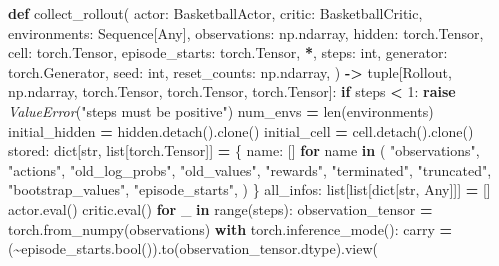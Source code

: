 \documentclass[
  american,
  11pt,
  letterpaper,
]{article}
\newenvironment{Shaded}{\begin{snugshade}}{\end{snugshade}}
\newcommand{\BuiltInTok}[1]{#1}
\newcommand{\ControlFlowTok}[1]{\textcolor[rgb]{0.13,0.29,0.53}{\textbf{#1}}}
\newcommand{\DecValTok}[1]{\textcolor[rgb]{0.00,0.00,0.81}{#1}}
\newcommand{\KeywordTok}[1]{\textcolor[rgb]{0.13,0.29,0.53}{\textbf{#1}}}
\newcommand{\NormalTok}[1]{#1}
\newcommand{\OperatorTok}[1]{\textcolor[rgb]{0.81,0.36,0.00}{\textbf{#1}}}
\newcommand{\PreprocessorTok}[1]{\textcolor[rgb]{0.56,0.35,0.01}{\textit{#1}}}
\newcommand{\StringTok}[1]{\textcolor[rgb]{0.31,0.60,0.02}{#1}}
\renewenvironment{Shaded}{\par\smallskip}{\par\smallskip}
\begin{document}
\begin{Shaded}
\begin{Highlighting}[]
\KeywordTok{def}\NormalTok{ collect\_rollout(}
\NormalTok{    actor: BasketballActor,}
\NormalTok{    critic: BasketballCritic,}
\NormalTok{    environments: Sequence[Any],}
\NormalTok{    observations: np.ndarray,}
\NormalTok{    hidden: torch.Tensor,}
\NormalTok{    cell: torch.Tensor,}
\NormalTok{    episode\_starts: torch.Tensor,}
    \OperatorTok{*}\NormalTok{,}
\NormalTok{    steps: }\BuiltInTok{int}\NormalTok{,}
\NormalTok{    generator: torch.Generator,}
\NormalTok{    seed: }\BuiltInTok{int}\NormalTok{,}
\NormalTok{    reset\_counts: np.ndarray,}
\NormalTok{) }\OperatorTok{{-}\textgreater{}} \BuiltInTok{tuple}\NormalTok{[Rollout, np.ndarray, torch.Tensor, torch.Tensor, torch.Tensor]:}
    \ControlFlowTok{if}\NormalTok{ steps }\OperatorTok{\textless{}} \DecValTok{1}\NormalTok{:}
        \ControlFlowTok{raise} \PreprocessorTok{ValueError}\NormalTok{(}\StringTok{"steps must be positive"}\NormalTok{)}
\NormalTok{    num\_envs }\OperatorTok{=} \BuiltInTok{len}\NormalTok{(environments)}
\NormalTok{    initial\_hidden }\OperatorTok{=}\NormalTok{ hidden.detach().clone()}
\NormalTok{    initial\_cell }\OperatorTok{=}\NormalTok{ cell.detach().clone()}
\NormalTok{    stored: }\BuiltInTok{dict}\NormalTok{[}\BuiltInTok{str}\NormalTok{, }\BuiltInTok{list}\NormalTok{[torch.Tensor]] }\OperatorTok{=}\NormalTok{ \{}
\NormalTok{        name: []}
        \ControlFlowTok{for}\NormalTok{ name }\KeywordTok{in}\NormalTok{ (}
            \StringTok{"observations"}\NormalTok{,}
            \StringTok{"actions"}\NormalTok{,}
            \StringTok{"old\_log\_probs"}\NormalTok{,}
            \StringTok{"old\_values"}\NormalTok{,}
            \StringTok{"rewards"}\NormalTok{,}
            \StringTok{"terminated"}\NormalTok{,}
            \StringTok{"truncated"}\NormalTok{,}
            \StringTok{"bootstrap\_values"}\NormalTok{,}
            \StringTok{"episode\_starts"}\NormalTok{,}
\NormalTok{        )}
\NormalTok{    \}}
\NormalTok{    all\_infos: }\BuiltInTok{list}\NormalTok{[}\BuiltInTok{list}\NormalTok{[}\BuiltInTok{dict}\NormalTok{[}\BuiltInTok{str}\NormalTok{, Any]]] }\OperatorTok{=}\NormalTok{ []}
\NormalTok{    actor.}\BuiltInTok{eval}\NormalTok{()}
\NormalTok{    critic.}\BuiltInTok{eval}\NormalTok{()}
    \ControlFlowTok{for}\NormalTok{ \_ }\KeywordTok{in} \BuiltInTok{range}\NormalTok{(steps):}
\NormalTok{        observation\_tensor }\OperatorTok{=}\NormalTok{ torch.from\_numpy(observations)}
        \ControlFlowTok{with}\NormalTok{ torch.inference\_mode():}
\NormalTok{            carry }\OperatorTok{=}\NormalTok{ (}\OperatorTok{\textasciitilde{}}\NormalTok{episode\_starts.}\BuiltInTok{bool}\NormalTok{()).to(observation\_tensor.dtype).view(}

\end{Highlighting}
\end{Shaded}
\end{document}
